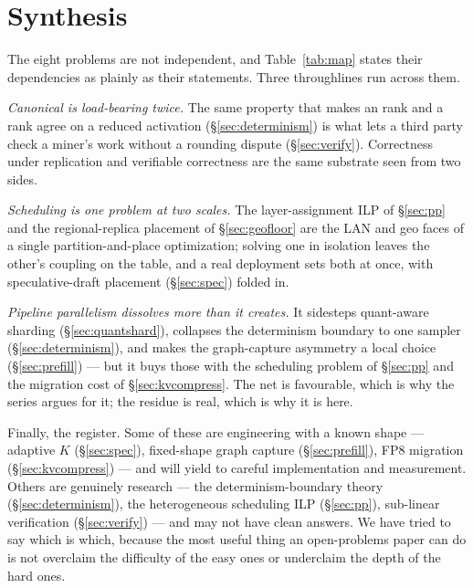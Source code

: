 \documentclass[11pt]{article}
\begin{document}
\section{Synthesis}
\label{sec:synthesis}

The eight problems are not independent, and Table~\ref{tab:map} states their dependencies as plainly as
their statements. Three throughlines run across them.

\emph{Canonical  is load-bearing twice.} The same property that makes an  rank and a
 rank agree on a reduced activation (\S\ref{sec:determinism}) is what lets a third party check a
miner's work without a rounding dispute (\S\ref{sec:verify}). Correctness under replication and verifiable
correctness are the same substrate seen from two sides.

\emph{Scheduling is one problem at two scales.} The layer-assignment ILP of \S\ref{sec:pp} and the
regional-replica placement of \S\ref{sec:geofloor} are the LAN and geo faces of a single
partition-and-place optimization; solving one in isolation leaves the other's coupling on the table, and a
real deployment sets both at once, with speculative-draft placement (\S\ref{sec:spec}) folded in.

\emph{Pipeline parallelism dissolves more than it creates.} It sidesteps quant-aware sharding
(\S\ref{sec:quantshard}), collapses the determinism boundary to one sampler (\S\ref{sec:determinism}), and
makes the graph-capture asymmetry a local choice (\S\ref{sec:prefill}) --- but it buys those with the
scheduling problem of \S\ref{sec:pp} and the migration cost of \S\ref{sec:kvcompress}. The net is
favourable, which is why the series argues for it; the residue is real, which is why it is here.

Finally, the register. Some of these are engineering with a known shape --- adaptive $K$ (\S\ref{sec:spec}),
fixed-shape graph capture (\S\ref{sec:prefill}), FP8 migration (\S\ref{sec:kvcompress}) --- and will yield
to careful implementation and measurement. Others are genuinely research --- the determinism-boundary
theory (\S\ref{sec:determinism}), the heterogeneous scheduling ILP (\S\ref{sec:pp}), sub-linear
verification (\S\ref{sec:verify}) --- and may not have clean answers. We have tried to say which is which,
because the most useful thing an open-problems paper can do is not overclaim the difficulty of the easy
ones or underclaim the depth of the hard ones.
\end{document}
